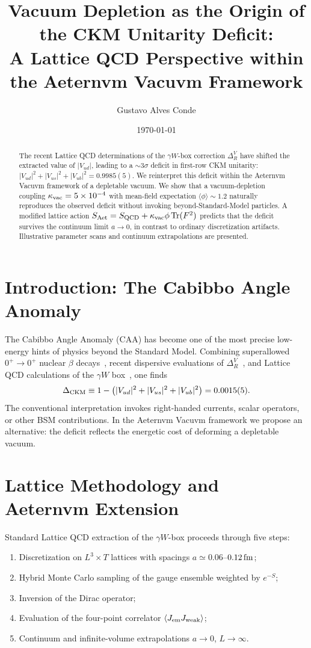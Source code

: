 \documentclass[aps,prd,preprint,amsmath,amssymb]{revtex4-2}
\title{Vacuum Depletion as the Origin of the CKM Unitarity Deficit:\\
A Lattice QCD Perspective within the Aeternvm Vacuvm Framework}
\author{Gustavo Alves Conde}
\affiliation{Aeternvm Vacuvm Collaboration, Itagua\c{c}u, ES, Brazil}
\date{\today}
\begin{document}
\maketitle

\begin{abstract}
The recent Lattice QCD determinations of the $\gamma W$-box correction $\Delta_R^V$ have shifted the extracted value of $|V_{ud}|$, leading to a $\sim 3\sigma$ deficit in first-row CKM unitarity: $|V_{ud}|^2+|V_{us}|^2+|V_{ub}|^2=0.9985(5)$. We reinterpret this deficit within the Aeternvm Vacuvm framework of a depletable vacuum. We show that a vacuum-depletion coupling $\kappa_{\rm vac}=5\times10^{-4}$ with mean-field expectation $\langle\phi\rangle\sim 1.2$ naturally reproduces the observed deficit without invoking beyond-Standard-Model particles. A modified lattice action $S_{\rm Aet}=S_{\rm QCD}+\kappa_{\rm vac}\phi\,{\rm Tr}(F^2)$ predicts that the deficit survives the continuum limit $a\to0$, in contrast to ordinary discretization artifacts. Illustrative parameter scans and continuum extrapolations are presented.
\end{abstract}

\section{Introduction: The Cabibbo Angle Anomaly}
The Cabibbo Angle Anomaly (CAA) has become one of the most precise low-energy hints of physics beyond the Standard Model. Combining superallowed $0^+\to0^+$ nuclear $\beta$ decays~\cite{Hardy2020}, recent dispersive evaluations of $\Delta_R^V$~\cite{Seng2018,Seng2020}, and Lattice QCD calculations of the $\gamma W$ box~\cite{FermilabMILC}, one finds
\begin{equation}
\Delta_{\rm CKM}\equiv 1-\bigl(|V_{ud}|^2+|V_{us}|^2+|V_{ub}|^2\bigr)=0.0015(5).
\end{equation}
The conventional interpretation invokes right-handed currents, scalar operators, or other BSM contributions. In the Aeternvm Vacuvm framework we propose an alternative: the deficit reflects the energetic cost of deforming a depletable vacuum.

\section{Lattice Methodology and Aeternvm Extension}
Standard Lattice QCD extraction of the $\gamma W$-box proceeds through five steps:
\begin{enumerate}
\item Discretization on $L^3\times T$ lattices with spacings $a\simeq0.06$--$0.12\,{\rm fm}$;
\item Hybrid Monte Carlo sampling of the gauge ensemble weighted by $e^{-S}$;
\item Inversion of the Dirac operator;
\item Evaluation of the four-point correlator $\langle J_{\rm em}J_{\rm weak}\rangle$;
\item Continuum and infinite-volume extrapolations $a\to0$, $L\to\infty$.
\end{enumerate}
\end{document}
